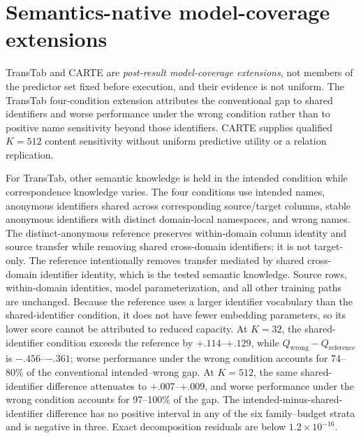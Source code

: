 
\section{Semantics-native model-coverage extensions}
\label{sec:app-learner-coverage}
\label{app:semantic_learners}

TransTab and CARTE are \emph{post-result model-coverage extensions}, not
members of the predictor set fixed before execution, and their evidence is not
uniform. The TransTab four-condition extension attributes the conventional gap
to shared identifiers and worse performance under the wrong condition rather
than to positive name sensitivity beyond those identifiers. CARTE supplies
qualified $K=512$ content sensitivity without uniform predictive utility or a
relation replication.

For TransTab, other semantic knowledge is held in the intended condition while
correspondence knowledge varies. The four conditions use intended names, anonymous
identifiers shared across corresponding source/target columns, stable anonymous
identifiers with distinct domain-local namespaces, and wrong names. The
distinct-anonymous reference preserves within-domain column identity and
source transfer while removing shared cross-domain identifiers; it
is not target-only. 
The reference intentionally removes transfer mediated by shared cross-domain
identifier identity, which is the tested semantic knowledge. Source rows,
within-domain identities, model parameterization, and all other training paths
are unchanged. Because the reference uses a larger identifier vocabulary than
the shared-identifier condition, it does not have fewer embedding parameters,
so its lower score cannot be attributed to reduced capacity.
At $K=32$, the shared-identifier condition exceeds the reference by
$+.114$--$+.129$, while $Q_{\mathrm{wrong}}-Q_{\mathrm{reference}}$ is
$-.456$--$-.361$; worse performance under the wrong condition accounts for
74--80\% of the conventional intended--wrong gap. At $K=512$, the
same shared-identifier difference attenuates to $+.007$--$+.009$, and worse
performance under the wrong condition accounts for 97--100\% of the gap.
The intended-minus-shared-identifier difference has no positive interval in any
of the six family--budget strata and is negative in three. Exact decomposition
residuals are below $1.2\times10^{-16}$.

